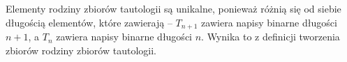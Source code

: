 Elementy rodziny zbiorów tautologii są unikalne, ponieważ różnią się od siebie długością elementów, które zawierają -- $T_{n + 1}$ zawiera napisy binarne długości $n + 1$, a $T_n$ zawiera napisy binarne długości $n$. Wynika to z definicji tworzenia zbiorów rodziny zbiorów tautologii.